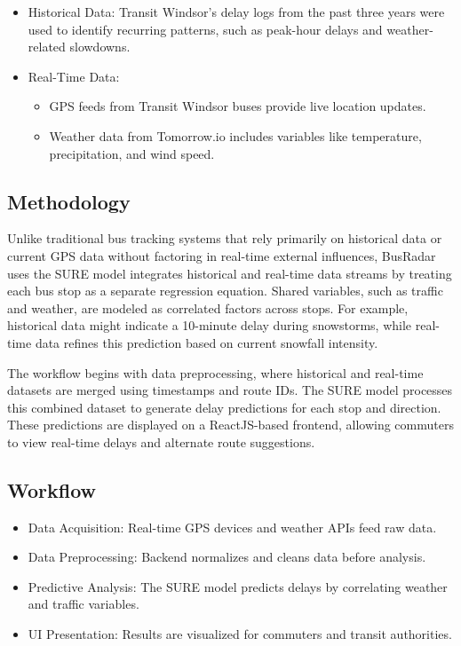 \documentclass[conference]{IEEEtran}
\begin{document}
\begin{itemize}
    \item Historical Data:  Transit Windsor’s delay logs from the past three years were used to identify recurring patterns, such as peak-hour delays and weather-related slowdowns.
    \item Real-Time Data:
    \begin{itemize}
        \item GPS feeds from Transit Windsor buses provide live location updates.
        \item Weather data from Tomorrow.io includes variables like temperature, precipitation, and wind speed.
    \end{itemize}
\end{itemize}

\subsection{Methodology }
Unlike traditional bus tracking systems that rely primarily on historical data or current GPS data without factoring in real-time external influences, BusRadar uses the SURE model integrates historical and real-time data streams by treating each bus stop as a separate regression equation. Shared variables, such as traffic and weather, are modeled as correlated factors across stops. For example, historical data might indicate a 10-minute delay during snowstorms, while real-time data refines this prediction based on current snowfall intensity. 

The workflow begins with data preprocessing, where historical and real-time datasets are merged using timestamps and route IDs. The SURE model processes this combined dataset to generate delay predictions for each stop and direction. These predictions are displayed on a ReactJS-based frontend, allowing commuters to view real-time delays and alternate route suggestions. 

\subsection{Workflow}
\begin{itemize}
    \item Data Acquisition: Real-time GPS devices and weather APIs feed raw data.
    \item Data Preprocessing: Backend normalizes and cleans data before analysis.
    \item Predictive Analysis: The SURE model predicts delays by correlating weather and traffic variables.
    \item UI Presentation: Results are visualized for commuters and transit authorities.
\end{itemize}
\end{document}
